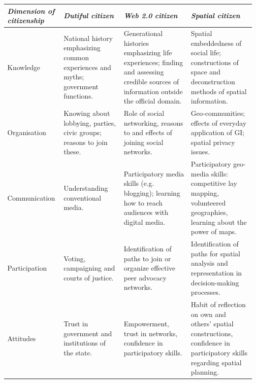 {\raggedright
\begin{tabularx}{0.95\textwidth}{ p{27mm} | X X X}
    {\small\textit{Dimension of citizenship}}
    & {\small\textit{Dutiful citizen}} 
    & {\small\textit{Web 2.0 citizen}}
    & {\small\textit{Spatial citizen}}\\
    \midrule
    {\small Knowledge }
    & {\footnotesize National history emphasizing common experiences and myths; government functions}. 
    & {\footnotesize Generational histories emphasizing life experiences; finding and assessing credible sources of information outside the official domain. }
    & {\footnotesize Spatial embeddedness of social life; constructions of space and deconstruction methods of spatial information. } \\
    \hline
    {\small Organisation }
    & {\footnotesize Knowing about lobbying, parties, civic groups; reasons to join these.} 
    & {\footnotesize Role of social networking, reasons to and effects of joining social networks}.
    & {\footnotesize Geo-communities; effects of everyday application of GI; spatial privacy issues}.  \\
    \hline
    \small Communication 
    & \footnotesize Understanding conventional media. 
    & \footnotesize Participatory media skills (e.g. blogging); learning how to reach audiences with digital media. 
    & \footnotesize Participatory geo-media skills: competitive lay mapping, volunteered geographies, learning about the power of maps.  \\
    \hline
    \small Participation 
    & \footnotesize Voting, campaigning and courts of justice. 
    & \footnotesize Identification of paths to join or organize effective peer advocacy networks.
    & \footnotesize Identification of paths for spatial analysis and representation in decision-making processes.  \\
    \hline
    \small Attitudes 
    & \footnotesize Trust in government and institutions of the state. 
    & \footnotesize Empowerment, trust in networks, confidence in participatory skills. 
    & \footnotesize Habit of reflection on own and others' spatial constructions, confidence in participatory skills regarding spatial planning.  
\end{tabularx}
}
~\label{tab:SpatialCitizen}

\setlength{\parskip}{1em}

